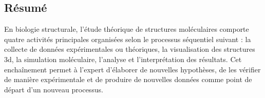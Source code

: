 
{}%
\pagestyle{plain}

\setlength{\headheight}{0.pt}
        


    

\footnotesize
\subsection*{Résumé}












\footnotesize
En biologie structurale, l’étude théorique de structures moléculaires comporte quatre activités principales organisées selon le processus séquentiel suivant : la collecte de données expérimentales ou théoriques, la visualisation des structures 3d, la simulation moléculaire, l’analyse et l’interprétation des résultats. Cet enchaînement permet à l’expert d’élaborer de nouvelles hypothèses, de les vérifier de manière expérimentale et de produire de nouvelles données comme point de départ d’un nouveau processus.

